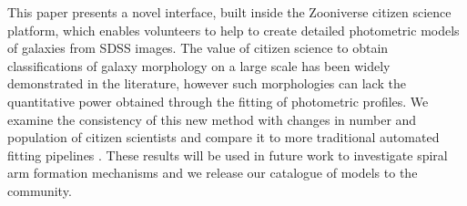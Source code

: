 \documentclass[../main.tex]{subfiles}
\begin{document}
This paper presents a novel interface, built inside the Zooniverse citizen science platform, which enables volunteers to help to create detailed photometric models of galaxies from SDSS images. The value of citizen science to obtain classifications of galaxy morphology on a large scale has been widely demonstrated in the literature, however such morphologies can lack the quantitative power obtained through the fitting of photometric profiles. We examine the consistency of this new method with changes in number and population of citizen scientists and compare it to more traditional automated fitting pipelines . These results will be used in future work to investigate spiral arm formation mechanisms and we release our catalogue of models to the community.
\end{document}
